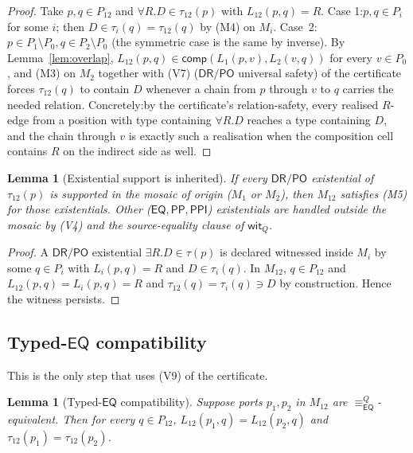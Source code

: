 \documentclass[11pt]{article}
\newtheorem{lemma}[theorem]{Lemma}
\newcommand{\EQ}{\mathsf{EQ}}
\newcommand{\PP}{\mathsf{PP}}
\newcommand{\PPI}{\mathsf{PPI}}
\newcommand{\PO}{\mathsf{PO}}
\newcommand{\DR}{\mathsf{DR}}
\newcommand{\comp}{\mathsf{comp}}
\newcommand{\eqQ}{\equiv_{\EQ}^{Q}}
\begin{document}
\begin{proof}
Take \(p, q \in P_{12}\) and \(\forall R.D \in \tau_{12}(p)\) with
\(L_{12}(p, q) = R\).  Case 1:\@ \(p, q \in P_i\) for some \(i\);\@
then \(D \in \tau_i(q) = \tau_{12}(q)\) by (M4) on \(M_i\).  Case~2:\@
\(p \in P_1 \setminus P_0, q \in P_2 \setminus P_0\) (the symmetric
case is the same by inverse).  By Lemma~\ref{lem:overlap},
\(L_{12}(p, q) \in \comp(L_1(p, v), L_2(v, q))\) for every \(v \in P_0\),
and (M3) on \(M_2\) together with (V7) (\(\DR/\PO\) universal
safety) of the certificate forces \(\tau_{12}(q)\) to contain \(D\)
whenever a chain from \(p\) through \(v\) to \(q\) carries the
needed relation.  Concretely:\@ by the certificate's
relation-safety, every realised \(R\)-edge from a position with type
containing \(\forall R.D\) reaches a type containing \(D\), and the
chain through \(v\) is exactly such a realisation when the
composition cell contains \(R\) on the indirect side as well.
\end{proof}

\begin{lemma}[Existential support is inherited]\label{lem:M5-inherited}
If every \(\DR/\PO\) existential of \(\tau_{12}(p)\) is supported in
the mosaic of origin (\(M_1\) or \(M_2\)), then \(M_{12}\) satisfies
(M5) for those existentials.  Other (\(\EQ, \PP, \PPI\)) existentials
are handled outside the mosaic by (V4) and the source-equality clause
of \(\mathsf{wit}_Q\).
\end{lemma}

\begin{proof}
A \(\DR/\PO\) existential \(\exists R.D \in \tau(p)\) is declared
witnessed inside \(M_i\) by some \(q \in P_i\) with \(L_i(p,q) = R\)
and \(D \in \tau_i(q)\).  In \(M_{12}\), \(q \in P_{12}\) and
\(L_{12}(p,q) = L_i(p,q) = R\) and \(\tau_{12}(q) = \tau_i(q) \ni D\)
by construction.  Hence the witness persists.
\end{proof}

\subsection{Typed-\(\EQ\) compatibility}

This is the only step that uses (V9) of the certificate.

\begin{lemma}[Typed-\(\EQ\) compatibility]\label{lem:eq-compat}
Suppose ports \(p_1, p_2\) in \(M_{12}\) are \(\eqQ\)-equivalent.
Then for every \(q \in P_{12}\),
\(L_{12}(p_1, q) = L_{12}(p_2, q)\) and \(\tau_{12}(p_1) = \tau_{12}(p_2)\).
\end{lemma}
\end{document}

